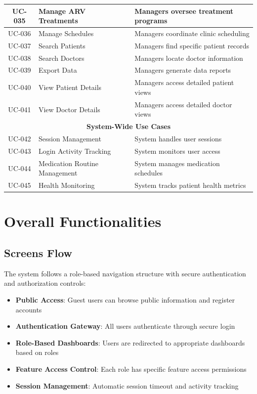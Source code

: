 \documentclass[12pt,a4paper]{article}
\begin{document}
\begin{longtable}{|c|p{4cm}|p{9cm}|}
\hline
UC-035 & Manage ARV Treatments & Managers oversee treatment programs \\
\hline
UC-036 & Manage Schedules & Managers coordinate clinic scheduling \\
\hline
UC-037 & Search Patients & Managers find specific patient records \\
\hline
UC-038 & Search Doctors & Managers locate doctor information \\
\hline
UC-039 & Export Data & Managers generate data reports \\
\hline
UC-040 & View Patient Details & Managers access detailed patient views \\
\hline
UC-041 & View Doctor Details & Managers access detailed doctor views \\
\hline
\multicolumn{3}{|c|}{\textbf{System-Wide Use Cases}} \\
\hline
UC-042 & Session Management & System handles user sessions \\
\hline
UC-043 & Login Activity Tracking & System monitors user access \\
\hline
UC-044 & Medication Routine Management & System manages medication schedules \\
\hline
UC-045 & Health Monitoring & System tracks patient health metrics \\
\hline
\end{longtable}

\section{Overall Functionalities}

\subsection{Screens Flow}

The system follows a role-based navigation structure with secure authentication and authorization controls:

\begin{itemize}
    \item \textbf{Public Access}: Guest users can browse public information and register accounts
    \item \textbf{Authentication Gateway}: All users authenticate through secure login
    \item \textbf{Role-Based Dashboards}: Users are redirected to appropriate dashboards based on roles
    \item \textbf{Feature Access Control}: Each role has specific feature access permissions
    \item \textbf{Session Management}: Automatic session timeout and activity tracking
\end{itemize}
\end{document}
